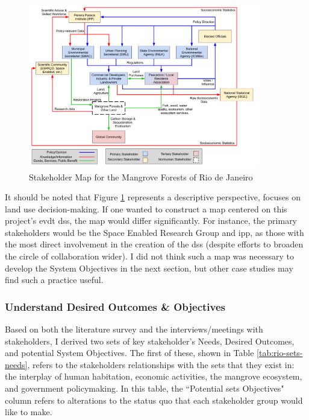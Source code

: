 \begin{figure}[!htb]
	\centering
	\includegraphics[width=0.9\textwidth]{Figures/chap4/Stakeholder_Map.png}
	\caption[Stakeholder Map for the Mangrove Forests of Rio de Janeiro]{Stakeholder Map for the Mangrove Forests of Rio de Janeiro}
	\label{fig:rio_stakemap}
\end{figure}

It should be noted that Figure \ref{fig:rio_stakemap} represents a descriptive perspective, focuses on land use decision-making. If one wanted to construct a map centered on this project's \ac{evdt} \ac{dss}, the map would differ significantly. For instance, the primary stakeholders would be the Space Enabled Research Group and \ac{ipp}, as those with the most direct involvement in the creation of the \ac{dss} (despite efforts to broaden the circle of collaboration wider). I did not think such a map was necessary to develop the System Objectives in the next section, but other case studies may find such a practice useful.

\subsubsection{Understand Desired Outcomes \& Objectives} \label{sec:rio-saf-objectives-result}

Based on both the literature survey and the interviews/meetings with stakeholders, I derived two sets of key stakeholder's Needs, Desired Outcomes, and potential System Objectives. The first of these, shown in Table \ref{tab:rio-sets-needs}, refers to the stakeholders relationships with the \ac{sets} that they exist in: the interplay of human habitation, economic activities, the mangrove ecosystem, and government policymaking. In this table, the ``Potential \ac{sets} Objectives" column refers to alterations to the status quo that each stakeholder group would like to make.

